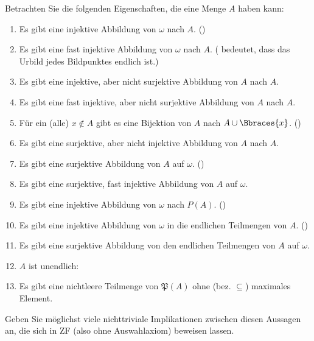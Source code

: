 
\begin{exercise}[272]

Betrachten Sie die folgenden Eigenschaften, die eine Menge $A$ haben kann:

\begin{enumerate}[label = \alph*.]
  \item Es gibt eine injektive Abbildung von $\omega$ nach $A$. ()
  \item Es gibt eine fast injektive Abbildung von $\omega$ nach $A$.
  ( bedeutet, dass das Urbild jedes Bildpunktes endlich ist.)
  \item Es gibt eine injektive, aber nicht surjektive Abbildung von $A$ nach $A$.
  \item Es gibt eine fast injektive, aber nicht surjektive Abbildung von $A$ nach $A$.
  \item Für ein (alle) $x \notin A$ gibt es eine Bijektion von $A$ nach $A \cup \Bbraces{x}$.
  ()
  \item Es gibt eine surjektive, aber nicht injektive Abbildung von $A$ nach $A$.
  \item Es gibt eine surjektive Abbildung von $A$ auf $\omega$. ()
  \item Es gibt eine surjektive, fast injektive Abbildung von $A$ auf $\omega$.
  \item Es gibt eine injektive Abbildung von $\omega$ nach $P(A)$. ()
  \item Es gibt eine injektive Abbildung von $\omega$ in die endlichen Teilmengen von $A$. ()
  \item Es gibt eine surjektive Abbildung von den endlichen Teilmengen von $A$ auf $\omega$.
  \item $A$ ist unendlich: 
  \item Es gibt eine nichtleere Teilmenge von $\mathfrak{P}(A)$ ohne (bez. $\subseteq$) maximales Element.
\end{enumerate}

Geben Sie möglichst viele nichttriviale Implikationen zwischen diesen Aussagen an, die sich in ZF (also ohne Auswahlaxiom) beweisen lassen.

\end{exercise}


